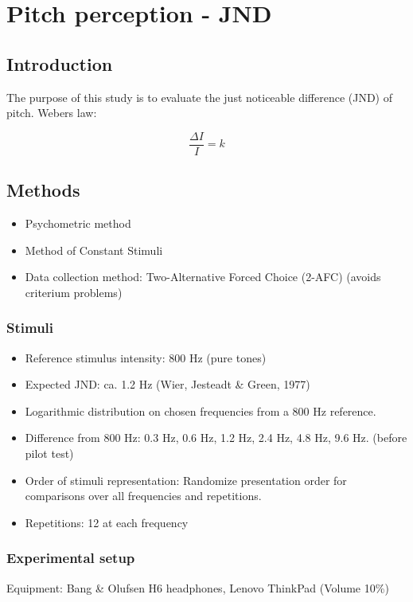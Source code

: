 \chapter*{Pitch perception - JND}

\section*{Introduction}
The purpose of this study is to evaluate the just noticeable difference (JND) of pitch.
Webers law:

\begin{equation}
\frac{\Delta I}{I} = k
\end{equation}

\section*{Methods}
%
\begin{itemize}
  \item Psychometric method
  \item Method of Constant Stimuli
  \item Data collection method: Two-Alternative Forced Choice (2-AFC) (avoids criterium problems)
\end{itemize}


\subsection*{Stimuli}
%
\begin{itemize}
\item Reference stimulus intensity: 800 Hz (pure tones)
\item Expected JND: ca. 1.2 Hz (Wier, Jesteadt \& Green, 1977)
\item Logarithmic distribution on chosen frequencies from a 800 Hz reference.
\item Difference from 800 Hz: 0.3 Hz, 0.6 Hz, 1.2 Hz, 2.4 Hz, 4.8 Hz, 9.6 Hz. (before pilot test)
\item Order of stimuli representation: Randomize presentation order for comparisons over all frequencies and repetitions.
\item Repetitions: 12 at each frequency 
\end{itemize}


\subsection*{Experimental setup}
Equipment: Bang \& Olufsen H6 headphones, Lenovo ThinkPad (Volume 10\%)

